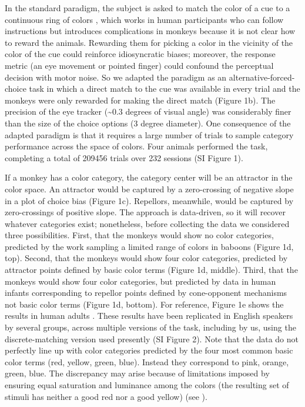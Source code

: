 In the standard paradigm, the subject is asked to match the color of a cue to a continuous ring of colors \citep{wilken_detection_2004,zhang_discrete_2008,bae_why_2015,panichello_error-correcting_2019,schurgin_psychophysical_2020}, which works in human participants who can follow instructions but introduces complications in monkeys because it is not clear how to reward the animals. Rewarding them for picking a color in the vicinity of the color of the cue could reinforce idiosyncratic biases\citep{panichello_error-correcting_2019}; moreover, the response metric (an eye movement or pointed finger) could confound the perceptual decision with motor noise. So we adapted the paradigm as an alternative-forced-choice task in which a direct match to the cue was available in every trial and the monkeys were only rewarded for making the direct match (Figure 1b). The precision of the eye tracker (\textasciitilde0.3 degrees of visual angle) was considerably finer than the size of the choice options (3 degree diameter). One consequence of the adapted paradigm is that it requires a large number of trials to sample category performance across the space of colors. Four animals performed the task, completing a total of 209456 trials over 232 sessions (SI Figure 1).

If a monkey has a color category, the category center will be an attractor in the color space. An attractor would be captured by a zero-crossing of negative slope in a plot of choice bias (Figure 1c). Repellors, meanwhile, would be captured by zero-crossings of positive slope. The approach is data-driven, so it will recover whatever categories exist; nonetheless, before collecting the data we considered three possibilities. First, that the monkeys would show no color categories, predicted by the work sampling a limited range of colors in baboons \citep{davidoff_cross-species_2010} (Figure 1d, top). Second, that the monkeys would show four color categories, predicted by attractor points defined by basic color terms (Figure 1d, middle). Third, that the monkeys would show four color categories, but predicted by data in human infants corresponding to repellor points defined by cone-opponent mechanisms not basic color terms \citep{skelton_biological_2017} (Figure 1d, bottom). For reference, Figure 1e shows the results in human adults \citep{panichello_error-correcting_2019}. These results have been replicated in English speakers by several groups, across multiple versions of the task, including by us, using the discrete-matching version used presently (SI Figure 2). Note that the data do not perfectly line up with color categories predicted by the four most common basic color terms (red, yellow, green, blue). Instead they correspond to pink, orange, green, blue. The discrepancy may arise because of limitations imposed by ensuring equal saturation and luminance among the colors (the resulting set of stimuli has neither a good red nor a good yellow) (see \citep{bae_why_2015}). 
